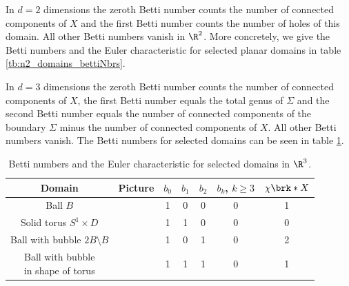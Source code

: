\begin{example}[In flatland]
  In $d=2$ dimensions the zeroth Betti number counts the number of connected components
  of $X$ and the first Betti number counts the number of holes of this domain.
  All other Betti numbers vanish in $\R^2$.
  More concretely, we give the Betti numbers and the Euler characteristic for selected planar domains in table \ref{tb:n2_domains_bettiNbrs}.
\end{example}
%
\begin{example}
  In $d=3$ dimensions the zeroth Betti number counts the number of connected components
  of $X$, the first Betti number equals the total genus of $\Sigma$ and the second Betti number
  equals the number of connected components of the boundary $\Sigma$ minus the number of connected components of $X$. All other Betti numbers vanish.
  The Betti numbers for selected domains can be seen in table \ref{tb:n3_domains_bettiNbrs}.
\end{example}
%
\begin{table}
  \centering
  \renewcommand{\arraystretch}{3}
  \begin{tabular}{c|c|c|c|c|c|c}
    Domain & Picture & $b_0$ & $b_1$ & $b_2$ & $b_k$, $k\geq3$ & $\chi\brk*{X}$ \\ \hline
    Ball $B$ & 
    \begin{minipage}{0.1\textwidth}
      \def\svgwidth{\textwidth}
      
    \end{minipage}
    & 1 & 0 & 0 & 0 & 1 \\
    Solid torus $S^1\times D$ & 
    \begin{minipage}{0.1\textwidth}
      \def\svgwidth{\textwidth}
      
    \end{minipage}
    & 1 & 1 & 0 & 0 & 0 \\
    Ball with bubble $2B\setminus B$ & 
    \begin{minipage}{0.1\textwidth}
      \def\svgwidth{\textwidth}
      
    \end{minipage}
    & 1 & 0 & 1 & 0 & 2 \\
    \makecell{Ball with bubble \\in shape of torus} & 
    \begin{minipage}{0.1\textwidth}
      \def\svgwidth{\textwidth}
      
    \end{minipage}
    & 1 & 1 & 1 & 0  & 1\\
  \end{tabular}
  \caption{Betti numbers and the Euler characteristic for selected domains in $\R^3$.}
  \label{tb:n3_domains_bettiNbrs}
\end{table}

